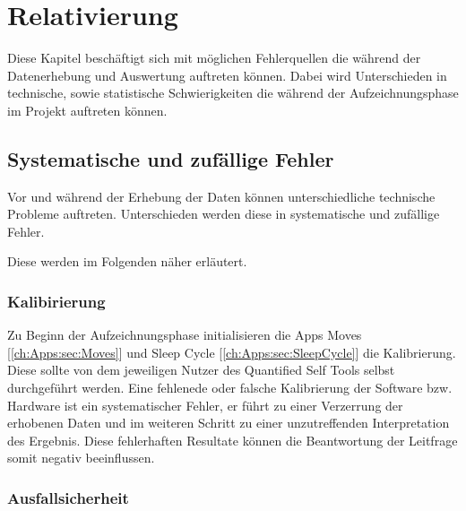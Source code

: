 
\chapter{Relativierung}
\label{ch:Relativierung}

Diese Kapitel beschäftigt sich mit möglichen Fehlerquellen die während der Datenerhebung und Auswertung auftreten können. 
Dabei wird Unterschieden in technische, sowie statistische Schwierigkeiten die während der Aufzeichnungsphase im Projekt auftreten können.

\section{Systematische und zufällige Fehler}
\label{ch:Relativierung:sec:SystematischeUndZufälligeFehler}

Vor und während der Erhebung der Daten können unterschiedliche technische Probleme auftreten.
Unterschieden werden diese in systematische und zufällige Fehler.

Diese werden im Folgenden näher erläutert.

\subsection{Kalibirierung}
\label{ch:Relativierung:sec:SystematischeUndZufälligeFehler:subsec:Kalibrierung}

Zu Beginn der Aufzeichnungsphase initialisieren die Apps Moves [\ref{ch:Apps:sec:Moves}] und Sleep Cycle [\ref{ch:Apps:sec:SleepCycle}] die Kalibrierung.
Diese sollte von dem jeweiligen Nutzer des Quantified Self Tools selbst durchgeführt werden.
Eine fehlenede oder  falsche Kalibrierung der Software bzw. Hardware ist ein systematischer Fehler, er führt zu einer Verzerrung der erhobenen Daten und im weiteren Schritt zu einer unzutreffenden Interpretation des Ergebnis.
Diese fehlerhaften Resultate können die Beantwortung der Leitfrage somit negativ beeinflussen. 


\subsection{Ausfallsicherheit}
\label{ch:Relativierung:sec:SystematischeUndZufälligeFehler:subsec:Ausfallsicherheit}

